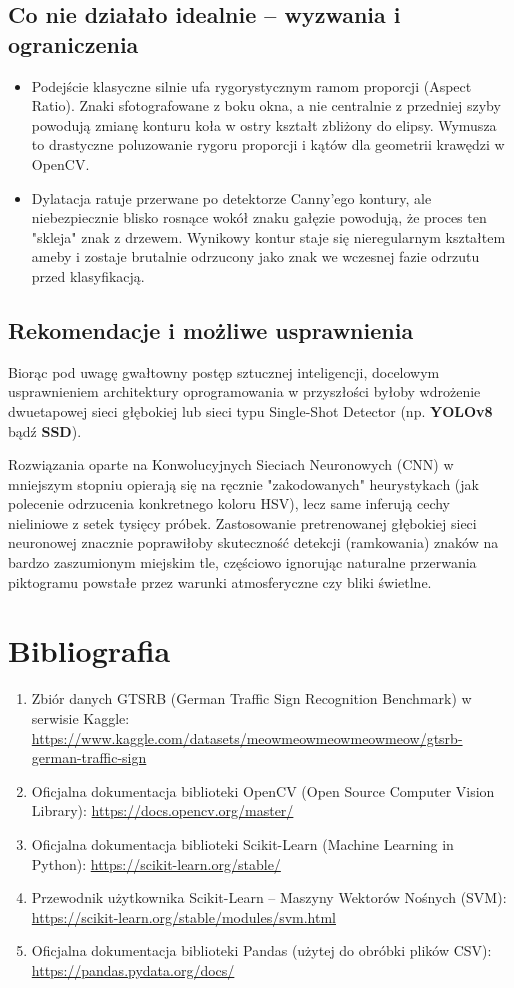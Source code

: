 \documentclass[12pt,a4paper]{article}
\begin{document}
\subsection{Co nie działało idealnie -- wyzwania i ograniczenia}
\begin{itemize}
    \item Podejście klasyczne silnie ufa rygorystycznym ramom proporcji (Aspect Ratio). Znaki sfotografowane z boku okna, a nie centralnie z przedniej szyby powodują zmianę konturu koła w ostry kształt zbliżony do elipsy. Wymusza to drastyczne poluzowanie rygoru proporcji i kątów dla geometrii krawędzi w OpenCV.
    \item Dylatacja ratuje przerwane po detektorze Canny'ego kontury, ale niebezpiecznie blisko rosnące wokół znaku gałęzie powodują, że proces ten "skleja" znak z drzewem. Wynikowy kontur staje się nieregularnym kształtem ameby i zostaje brutalnie odrzucony jako znak we wczesnej fazie odrzutu przed klasyfikacją.
\end{itemize}

\subsection{Rekomendacje i możliwe usprawnienia}
Biorąc pod uwagę gwałtowny postęp sztucznej inteligencji, docelowym usprawnieniem architektury oprogramowania w przyszłości byłoby wdrożenie dwuetapowej sieci głębokiej lub sieci typu Single-Shot Detector (np. \textbf{YOLOv8} bądź \textbf{SSD}). 

Rozwiązania oparte na Konwolucyjnych Sieciach Neuronowych (CNN) w mniejszym stopniu opierają się na ręcznie "zakodowanych" heurystykach (jak polecenie odrzucenia konkretnego koloru HSV), lecz same inferują cechy nieliniowe z setek tysięcy próbek. Zastosowanie pretrenowanej głębokiej sieci neuronowej znacznie poprawiłoby skuteczność detekcji (ramkowania) znaków na bardzo zaszumionym miejskim tle, częściowo ignorując naturalne przerwania piktogramu powstałe przez warunki atmosferyczne czy bliki świetlne.


\newpage
\section{Bibliografia}
\begin{enumerate}
    \item Zbiór danych GTSRB (German Traffic Sign Recognition Benchmark) w serwisie Kaggle: \url{https://www.kaggle.com/datasets/meowmeowmeowmeowmeow/gtsrb-german-traffic-sign}
    \item Oficjalna dokumentacja biblioteki OpenCV (Open Source Computer Vision Library): \url{https://docs.opencv.org/master/}
    \item Oficjalna dokumentacja biblioteki Scikit-Learn (Machine Learning in Python): \url{https://scikit-learn.org/stable/}
    \item Przewodnik użytkownika Scikit-Learn -- Maszyny Wektorów Nośnych (SVM): \url{https://scikit-learn.org/stable/modules/svm.html}
    \item Oficjalna dokumentacja biblioteki Pandas (użytej do obróbki plików CSV): \url{https://pandas.pydata.org/docs/}
\end{enumerate}
\end{document}
